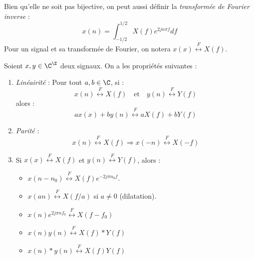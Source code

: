 \begin{proposition}
    Bien qu'elle ne soit pas bijective, on peut aussi définir la \emph{transformée de Fourier inverse} : 
    $$
        x(n) = \int_{-1/2}^{1/2} X(f) e^{2 j n \pi f} df 
    $$
    Pour un signal et sa transformée de Fourier, on notera $ x(x) \overset{F}{\longleftrightarrow} X(f)$. 
\end{proposition}

\begin{prop}
    Soient $x,y \in \C^\Z$ deux signaux. On a les propriétés suivantes : 
    \begin{enumerate}[label=\roman*)]
        \item \emph{Linéairité} : Pour tout $ a,b \in \C$, si : 
            $$ x(n) \overset{F}{\longleftrightarrow} X(f) \quad \text{et} \quad y(n) \overset{F}{\longleftrightarrow} Y(f) $$ 
        alors : 
            $$ 
                a x(x) + b y(n) \overset{F}{\longleftrightarrow} a X(f) + b Y(f) 
            $$ 
        \item \emph{Parité} : 
            $$ 
                x(n) \overset{F}{\longleftrightarrow} X(f) \Longrightarrow x(-n) \overset{F}{\longleftrightarrow} X(-f) 
            $$
        \item Si $ x(x) \overset{F}{\longleftrightarrow} X(f)$ et $ y(n) \overset{F}{\longleftrightarrow} Y(f)$, 
        alors : 
            \begin{itemize}
                \item $x(n - n_0) \overset{F}{\longleftrightarrow} X(f) e^{-2 j \pi n_0 f}$. 
                \item $x(an) \overset{F}{\longleftrightarrow} X(f/a)$ si $a \not = 0$ (dilatation). 
                \item $ x(n) e^{2 j \pi n f_0} \overset{F}{\longleftrightarrow} X(f - f_0) $
                \item $ x(n) y(n) \overset{F}{\longleftrightarrow} X(f) * Y(f) $
                \item $ x(n) * y(n) \overset{F}{\longleftrightarrow} X(f) Y(f)$ 
            \end{itemize}
    \end{enumerate}
\end{prop}

